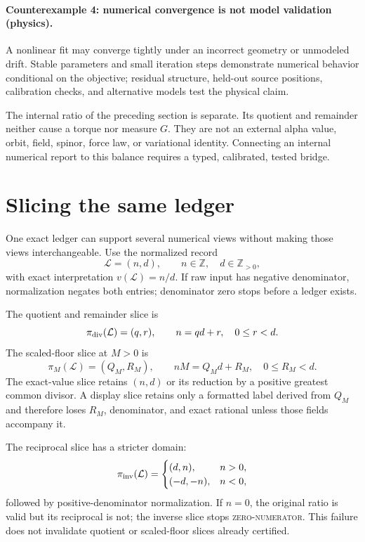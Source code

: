 \paragraph{Counterexample 4: numerical convergence is not model validation (physics).}
A nonlinear fit may converge tightly under an incorrect geometry or unmodeled drift.  Stable parameters and small
iteration steps demonstrate numerical behavior conditional on the objective; residual structure, held-out source
positions, calibration checks, and alternative models test the physical claim.

The internal ratio of the preceding section is separate.  Its quotient and remainder neither cause a torque nor
measure \(G\).  They are not an external alpha value, orbit, field, spinor, force law, or variational identity.
Connecting an internal numerical report to this balance requires a typed, calibrated, tested bridge.
\section{Slicing the same ledger}

One exact ledger can support several numerical views without making those views interchangeable.  Use the normalized
record
\[
\mathcal L=(n,d),\qquad n\in\mathbb Z,\quad d\in\mathbb Z_{>0},
\]
with exact interpretation \(v(\mathcal L)=n/d\).  If raw input has negative denominator, normalization negates both
entries; denominator zero stops before a ledger exists.

The quotient and remainder slice is
\[
\pi_{\rm div}(\mathcal L)=(q,r),\qquad n=qd+r,\quad0\leq r<d.
\]
The scaled-floor slice at \(M>0\) is
\[
\pi_M(\mathcal L)=(Q_M,R_M),\qquad nM=Q_Md+R_M,\quad0\leq R_M<d.
\]
The exact-value slice retains \((n,d)\) or its reduction by a positive greatest common divisor.  A display slice
retains only a formatted label derived from \(Q_M\) and therefore loses \(R_M\), denominator, and exact rational
unless those fields accompany it.

The reciprocal slice has a stricter domain:
\[
\pi_{\rm inv}(\mathcal L)=
\begin{cases}
(d,n),&n>0,\\
(-d,-n),&n<0,
\end{cases}
\]
followed by positive-denominator normalization.  If \(n=0\), the original ratio is valid but its reciprocal is not;
the inverse slice stops \textsc{zero-numerator}.  This failure does not invalidate quotient or scaled-floor slices
already certified.

